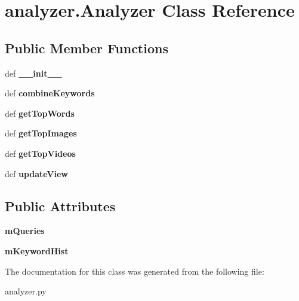 \hypertarget{classanalyzer_1_1Analyzer}{\section{analyzer.\-Analyzer Class Reference}
\label{classanalyzer_1_1Analyzer}
}
\subsection*{Public Member Functions}
\begin{DoxyCompactItemize}
\item 
\hypertarget{classanalyzer_1_1Analyzer_a3bfb8acf9d6b611543e51a4f7170ca27}{def {\bfseries \-\_\-\-\_\-init\-\_\-\-\_\-}}\label{classanalyzer_1_1Analyzer_a3bfb8acf9d6b611543e51a4f7170ca27}

\item 
\hypertarget{classanalyzer_1_1Analyzer_a69a08ee7b2a646b87f019d8b9553b853}{def {\bfseries combine\-Keywords}}\label{classanalyzer_1_1Analyzer_a69a08ee7b2a646b87f019d8b9553b853}

\item 
\hypertarget{classanalyzer_1_1Analyzer_afd09cd13d4b864f9df5d43c510759ab1}{def {\bfseries get\-Top\-Words}}\label{classanalyzer_1_1Analyzer_afd09cd13d4b864f9df5d43c510759ab1}

\item 
\hypertarget{classanalyzer_1_1Analyzer_af9a93d1bfcfc91e46ca2b1b2620d14c8}{def {\bfseries get\-Top\-Images}}\label{classanalyzer_1_1Analyzer_af9a93d1bfcfc91e46ca2b1b2620d14c8}

\item 
\hypertarget{classanalyzer_1_1Analyzer_aad1fd5c95914f1e660e33e2bbcc75798}{def {\bfseries get\-Top\-Videos}}\label{classanalyzer_1_1Analyzer_aad1fd5c95914f1e660e33e2bbcc75798}

\item 
\hypertarget{classanalyzer_1_1Analyzer_a14173ab2680c043c34bdbc89e7edc1d6}{def {\bfseries update\-View}}\label{classanalyzer_1_1Analyzer_a14173ab2680c043c34bdbc89e7edc1d6}

\end{DoxyCompactItemize}
\subsection*{Public Attributes}
\begin{DoxyCompactItemize}
\item 
\hypertarget{classanalyzer_1_1Analyzer_ae85923ff676fb1156a1c4dafd55d3213}{{\bfseries m\-Queries}}\label{classanalyzer_1_1Analyzer_ae85923ff676fb1156a1c4dafd55d3213}

\item 
\hypertarget{classanalyzer_1_1Analyzer_a383ed0736fdf320258645cf4c7a47f09}{{\bfseries m\-Keyword\-Hist}}\label{classanalyzer_1_1Analyzer_a383ed0736fdf320258645cf4c7a47f09}

\end{DoxyCompactItemize}


The documentation for this class was generated from the following file\-:\begin{DoxyCompactItemize}
\item 
analyzer.\-py\end{DoxyCompactItemize}
